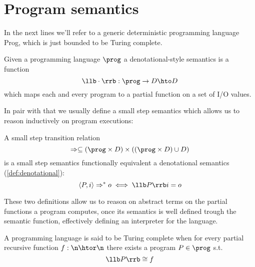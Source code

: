 \section{Program semantics}
In the next lines we'll refer to a generic deterministic programming
language Prog, which is just bounded to be Turing complete.


\begin{definition}\label{def:denotational}
  Given a programming language \(\prog\) a denotational-style
  semantics is a function \[ \llb \cdot \rrb : \prog \to D \hto D\]
  which maps each and every program to a partial function on a set of
  I/O values.
\end{definition}

In pair with that we usually define a small step semantics which
allows us to reason inductively on program executions:

\begin{definition}
  A small step transition relation \[\Rightarrow \subseteq (\prog
  \times D) \times ((\prog \times D) \cup D)\] is a small step
  semantics functionally equivalent a denotational semantics
  (\ref{def:denotational}): \[\langle P, i \rangle \Rightarrow^* o
  \iff \llb P \rrb i = o\]
\end{definition}


These two definitions allow us to reason on abstract terms on the
partial functions a program computes, once its semantics is well
defined trough the semantic function, effectively defining an
interpreter for the language.

\begin{definition}\label{def:turingc}
  A programming language is said to be Turing complete when for every
  partial recursive function \(f : \n \htor \n\) there exists a
  program \(P\in \prog\) s.t. \[\llb P \rrb \cong f\]
\end{definition}

